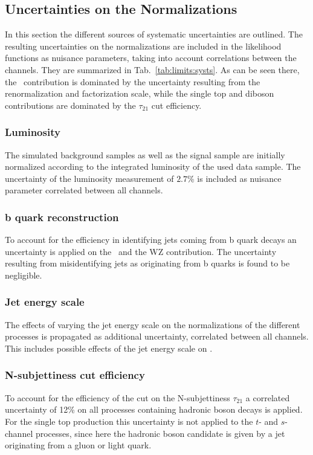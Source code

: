 \subsection*{Uncertainties on the Normalizations}
In this section the different sources  of systematic uncertainties are outlined. The resulting uncertainties on the normalizations are included in the likelihood functions as nuisance parameters, taking into account correlations between the channels. They are summarized in Tab.~\ref{tab:limits:systs}. As can be seen there, the \ttbar \ contribution is dominated by the uncertainty resulting from the renormalization and factorization scale, while the single top and diboson contributions are dominated by the $\tau_{21}$ cut efficiency.
\subsubsection*{Luminosity}
The simulated background samples as well as the signal sample are initially normalized according to the integrated luminosity of the used data sample. The uncertainty of the luminosity measurement of $2.7$\% \cite{lumi} is included as nuisance parameter correlated between all channels.
\subsubsection*{b quark reconstruction}
To account for the efficiency in identifying jets coming from b quark decays \cite{CSV2} an uncertainty is applied on the \ttbar \ and the WZ contribution. The uncertainty resulting from misidentifying jets as originating from b quarks is found to be negligible.
\subsubsection*{Jet energy scale}
The effects of varying the jet energy scale on the normalizations of the different processes is propagated as additional uncertainty, correlated between all channels. This includes possible effects of the jet energy scale on \MET .
\subsubsection*{N-subjettiness cut efficiency}
To account for the efficiency of the cut on the N-subjettiness $\tau_{21}$ a correlated uncertainty of 12\% on all processes containing hadronic boson decays is applied. For the single top production this uncertainty is not applied to the $t$- and $s$-channel processes, since here the hadronic boson candidate is given by a jet originating from a gluon or light quark.
